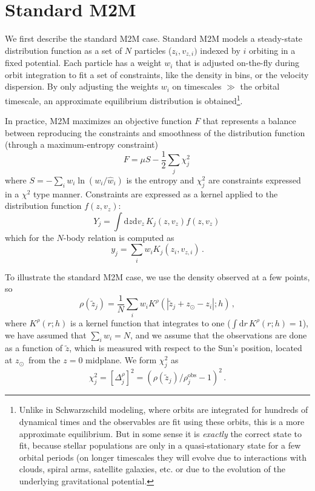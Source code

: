 \documentclass[12pt,preprint]{aastex}
\newcommand{\dd}{\mathrm{d}}
\newcommand{\zsun}{\ensuremath{z_\odot}}
\newcommand{\vz}{\ensuremath{v_z}}
\newcommand{\vzi}{\ensuremath{v_{z,i}}}
\newcommand{\zi}{\ensuremath{z_i}}
\newcommand{\wi}{\ensuremath{w_i}}
\newcommand{\zobs}{\ensuremath{\tilde{z}}}
\begin{document}
\section{Standard M2M}

We first describe the standard M2M case. Standard M2M models a
steady-state distribution function as a set of $N$ particles
($\zi,\vzi)$ indexed by $i$ orbiting in a fixed potential. Each
particle has a weight $\wi$ that is adjusted on-the-fly during orbit
integration to fit a set of constraints, like the density in bins, or
the velocity dispersion. By only adjusting the weights $\wi$ on
timescales $\gg$ the orbital timescale, an approximate equilibrium
distribution is obtained\footnote{Unlike in Schwarzschild modeling,
  where orbits are integrated for hundreds of dynamical times and the
  observables are fit using these orbits, this is a more approximate
  equilibrium. But in some sense it is \emph{exactly} the correct
  state to fit, because stellar populations are only in a
  quasi-stationary state for a few orbital periods (on longer
  timescales they will evolve due to interactions with clouds, spiral
  arms, satellite galaxies, etc. or due to the evolution of the
  underlying gravitational potential.}.

In practice, M2M maximizes an objective function $F$ that represents a
balance between reproducing the constraints and smoothness of the
distribution function (through a maximum-entropy constraint)
\begin{equation}
  F = \mu S - \frac{1}{2}\sum_j \chi^2_j\,
\end{equation}
where $S = - \sum_i w_i \ln\left(w_i/\hat{w}_i\right)$ is the entropy
and $\chi_j^2$ are constraints expressed in a $\chi^2$ type
manner. Constraints are expressed as a kernel applied to the
distribution function $f(z,\vz)$:
\begin{equation}
  Y_j = \int \dd z\dd \vz \,K_j(z,\vz) f(z,\vz)\,
\end{equation}
which for the $N$-body relation is computed as
\begin{equation}
  y_j = \sum_i \wi K_j(\zi,\vzi)\,.
\end{equation}

To illustrate the standard M2M case, we use the density observed at a
few points, so
\begin{equation}
  \rho(\zobs_j) = \frac{1}{N}\sum_i \wi K^\rho(|\zobs_j+\zsun - \zi|;h)\,,
\end{equation}
where $K^\rho(r;h)$ is a kernel function that integrates to one ($\int
\dd r\,K^\rho(r;h) = 1$), we have assumed that $\sum_i \wi = N$, and
we assume that the observations are done as a function of $\zobs$,
which is measured with respect to the Sun's position, located at \zsun\
from the $z=0$ midplane. We form $\chi^2_j$ as
\begin{equation}
  \chi_j^2 = [\Delta^\rho_j]^2 = \left( \rho(\zobs_j)/\rho^\mathrm{obs}_j-1\right)^2\,.
\end{equation}
\end{document}
